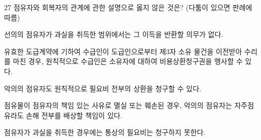 \begin{question}{27}
점유자와 회복자의 관계에 관한 설명으로 옳지 않은 것은? (다툼이 있으면 판례에 따름)
\begin{choices}
  \item 선의의 점유자가 과실을 취득한 범위에서는 그 이득을 반환할 의무가 없다.
  \item 유효한 도급계약에 기하여 수급인이 도급인으로부터 제3자 소유 물건을 이전받아 수리를 마친 경우, 원칙적으로 수급인은 소유자에 대하여 비용상환청구권을 행사할 수 있다.
  \item 악의의 점유자도 원칙적으로 필요비 전부의 상환을 청구할 수 있다.
  \item 점유물이 점유자의 책임 있는 사유로 멸실 또는 훼손된 경우, 악의의 점유자는 자주점유라도 손해 전부를 배상할 책임이 있다.
  \item 점유자가 과실을 취득한 경우에는 통상의 필요비는 청구하지 못한다.
\end{choices}
\end{question}
